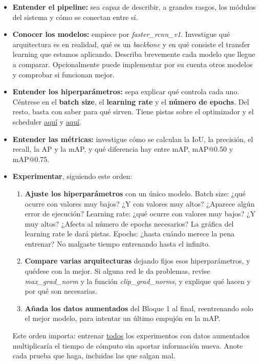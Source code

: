\documentclass[12pt,a4paper]{article}
\begin{document}
\begin{itemize}
    \item \textbf{Entender el pipeline:} sea capaz de describir, a grandes rasgos, los módulos del sistema y cómo se conectan entre sí.

    \item \textbf{Conocer los modelos:} empiece por \textit{faster\_rcnn\_v1}. Investigue qué arquitectura es en realidad, qué es un \textit{backbone} y en qué consiste el transfer learning que estamos aplicando. Describa brevemente cada modelo que llegue a comparar. Opcionalmente puede implementar por su cuenta otros modelos y comprobar si funcionan mejor.

    \item \textbf{Entender los hiperparámetros:} sepa explicar qué controla cada uno. Céntrese en el \textbf{batch size}, el \textbf{learning rate} y el \textbf{número de epochs}. Del resto, basta con saber para qué sirven. Tiene pistas sobre el optimizador y el scheduler \href{https://docs.pytorch.org/docs/stable/generated/torch.optim.SGD.html}{aquí} y \href{https://docs.pytorch.org/docs/stable/generated/torch.optim.lr_scheduler.ReduceLROnPlateau.html}{aquí}.

    \item \textbf{Entender las métricas:} investigue cómo se calculan la IoU, la precisión, el recall, la AP y la mAP, y qué diferencia hay entre mAP, mAP@0.50 y mAP@0.75.

    \item \textbf{Experimentar}, siguiendo este orden:
        \begin{enumerate}
            \item \textbf{Ajuste los hiperparámetros} con un único modelo. Batch size: ¿qué ocurre con valores muy bajos? ¿Y con valores muy altos? ¿Aparece algún error de ejecución? Learning rate: ¿qué ocurre con valores muy bajos? ¿Y muy altos? ¿Afecta al número de epochs necesarios? La gráfica del learning rate le dará pistas. Epochs: ¿hasta cuándo merece la pena entrenar? No malgaste tiempo entrenando hasta el infinito.
            \item \textbf{Compare varias arquitecturas} dejando fijos esos hiperparámetros, y quédese con la mejor. Si alguna red le da problemas, revise \textit{max\_grad\_norm} y la función \textit{clip\_grad\_norms}, y explique qué hacen y por qué son necesarias.
            \item \textbf{Añada los datos aumentados} del Bloque 1 al final, reentrenando solo el mejor modelo, para intentar un último empujón en la mAP.
        \end{enumerate}
        Este orden importa: entrenar \underline{todos} los experimentos con datos aumentados multiplicaría el tiempo de cómputo sin aportar información nueva. Anote cada prueba que haga, incluidas las que salgan mal.


\end{itemize}
\end{document}
